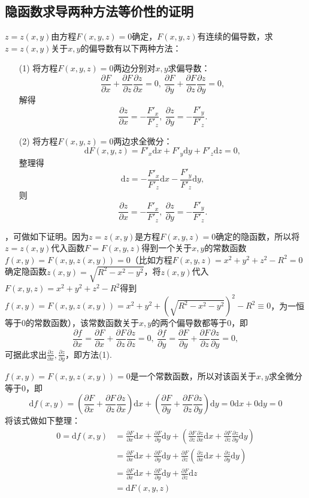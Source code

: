 \documentclass[12pt,UTF8]{ctexart}
\begin{document}
\subsection{隐函数求导两种方法等价性的证明}
$z=z(x,y)$由方程$F(x,y,z)=0$确定，$F(x,y,z)$有连续的偏导数，求$z=z(x,y)$关于$x,y$的偏导数有以下两种方法：
\begin{enumerate}
\item[(1)]将方程$F(x,y,z)=0$两边分别对$x,y$求偏导数：
\[\frac{\partial F}{\partial x}+\frac{\partial F}{\partial z}\frac{\partial z}{\partial x}=0,\ \frac{\partial F}{\partial y}+\frac{\partial F}{\partial z}\frac{\partial z}{\partial y}=0,\]
解得
\[\frac{\partial z}{\partial x}=-\frac{F'_x}{F'_z},\ \frac{\partial z}{\partial y}=-\frac{F'_y}{F'_z}.\]
\item[(2)]将方程$F(x,y,z)=0$两边求全微分：
\[\mathrm dF(x,y,z)=F'_x\mathrm dx+F'_y\mathrm dy+F'_z\mathrm dz=0,\]
整理得
\[\mathrm dz=-\frac{F'_x}{F'_z}\mathrm dx-\frac{F'_y}{F'_z}\mathrm dy,\]
则
\[\frac{\partial z}{\partial x}=-\frac{F'_x}{F'_z},\ \frac{\partial z}{\partial y}=-\frac{F'_y}{F'_z}.\]
\end{enumerate}
\par
{}，可做如下证明。因为$z=z(x,y)$是方程$F(x,y,z)=0$确定的隐函数，所以将$z=z(x,y)$代入函数$F=F(x,y,z)$得到一个关于$x,y$的常数函数$f(x,y)=F(x,y,z(x,y))=0$（比如方程$F(x,y,z)=x^2+y^2+z^2-R^2=0$确定隐函数$z(x,y)=\sqrt{R^2-x^2-y^2}$，将$z(x,y)$代入$F(x,y,z)=x^2+y^2+z^2-R^2$得到$f(x,y)=F(x,y,z(x,y))=x^2+y^2+(\sqrt{R^2-x^2-y^2})^2-R^2\equiv0$，为一恒等于$0$的常数函数），该常数函数关于$x,y$的两个偏导数都等于$0$，即
\[\frac{\partial f}{\partial x}=\frac{\partial F}{\partial x}+\frac{\partial F}{\partial z}\frac{\partial z}{\partial z}=0,\ \frac{\partial f}{\partial y}=\frac{\partial F}{\partial y}+\frac{\partial F}{\partial z}\frac{\partial z}{\partial y}=0,\]
可据此求出$\frac{\partial z}{\partial x},\frac{\partial z}{\partial y}$，即方法(1).
\par
{}$f(x,y)=F(x,y,z(x,y))=0$是一个常数函数，所以对该函关于$x,y$求全微分等于0，即
\[
\mathrm df(x,y)=(\frac{\partial F}{\partial x}+\frac{\partial F}{\partial z}\frac{\partial z}{\partial x})\mathrm dx+(\frac{\partial F}{\partial y}+\frac{\partial F}{\partial z}\frac{\partial z}{\partial y})\mathrm dy=0\mathrm dx+0\mathrm dy=0
\]
将该式做如下整理：
\begin{equation}\label{per-diff}
\begin{split}
0=\mathrm df(x,y)&=\frac{\partial F}{\partial x}\mathrm dx+\frac{\partial F}{\partial y}\mathrm dy+(\frac{\partial F}{\partial z}\frac{\partial z}{\partial x}\mathrm dx+\frac{\partial F}{\partial z}\frac{\partial z}{\partial y}\mathrm dy)\\
&=\frac{\partial F}{\partial x}\mathrm dx+\frac{\partial F}{\partial y}\mathrm dy+\frac{\partial F}{\partial z}(\frac{\partial z}{\partial x}\mathrm dx+\frac{\partial z}{\partial y}\mathrm dy)\\
&=\frac{\partial F}{\partial x}\mathrm dx+\frac{\partial F}{\partial y}\mathrm dy+\frac{\partial F}{\partial z}\mathrm dz\\
&=\mathrm dF(x,y,z)
\end{split}\end{equation}
\end{document}
